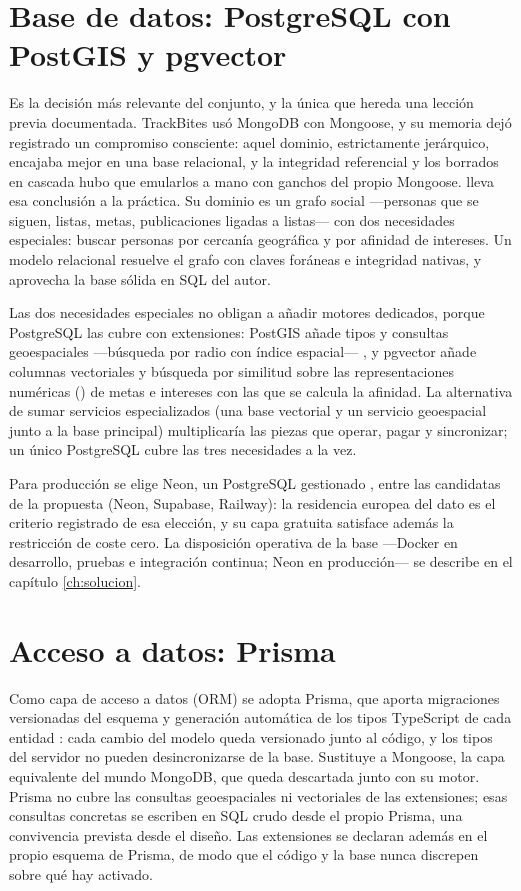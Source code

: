 \section{Base de datos: PostgreSQL con PostGIS y pgvector}
\label{sec:alt-bd}

Es la decisión más relevante del conjunto, y la única que hereda una lección previa documentada.
TrackBites usó MongoDB con Mongoose, y su memoria dejó registrado un compromiso consciente: aquel dominio, estrictamente jerárquico, encajaba mejor en una base relacional, y la integridad referencial y los borrados en cascada hubo que emularlos a mano con ganchos del propio Mongoose.
\bukit lleva esa conclusión a la práctica.
Su dominio es un grafo social —personas que se siguen, listas, metas, publicaciones ligadas a listas— con dos necesidades especiales: buscar personas por cercanía geográfica y por afinidad de intereses.
Un modelo relacional resuelve el grafo con claves foráneas e integridad nativas, y aprovecha la base sólida en \ac{SQL} del autor.

Las dos necesidades especiales no obligan a añadir motores dedicados, porque PostgreSQL las cubre con extensiones: PostGIS añade tipos y consultas geoespaciales —búsqueda por radio con índice espacial— \parencite{postgis-docs}, y pgvector añade columnas vectoriales y búsqueda por similitud \parencite{pgvector-docs} sobre las representaciones numéricas () de metas e intereses con las que se calcula la afinidad.
La alternativa de sumar servicios especializados (una base vectorial y un servicio geoespacial junto a la base principal) multiplicaría las piezas que operar, pagar y sincronizar; un único PostgreSQL cubre las tres necesidades a la vez.

Para producción se elige Neon, un PostgreSQL gestionado \parencite{neon-docs}, entre las candidatas de la propuesta (Neon, Supabase, Railway): la residencia europea del dato es el criterio registrado de esa elección, y su capa gratuita satisface además la restricción de coste cero.
La disposición operativa de la base —Docker en desarrollo, pruebas e integración continua; Neon en producción— se describe en el capítulo \ref{ch:solucion}.

\section{Acceso a datos: Prisma}
\label{sec:alt-orm}

Como capa de acceso a datos (\ac{ORM}) se adopta Prisma, que aporta migraciones versionadas del esquema y generación automática de los tipos TypeScript de cada entidad \parencite{prisma-docs}: cada cambio del modelo queda versionado junto al código, y los tipos del servidor no pueden desincronizarse de la base.
Sustituye a Mongoose, la capa equivalente del mundo MongoDB, que queda descartada junto con su motor.
Prisma no cubre las consultas geoespaciales ni vectoriales de las extensiones; esas consultas concretas se escriben en \ac{SQL} crudo desde el propio Prisma, una convivencia prevista desde el diseño.
Las extensiones se declaran además en el propio esquema de Prisma, de modo que el código y la base nunca discrepen sobre qué hay activado.

